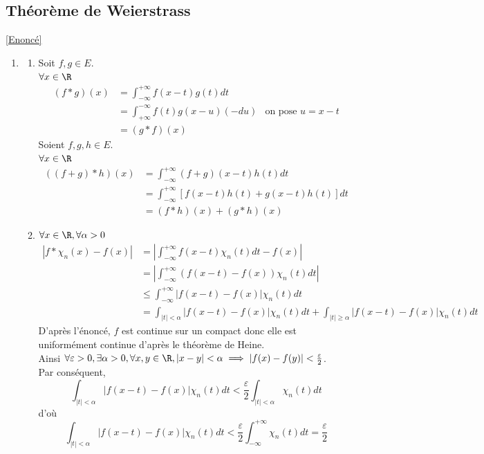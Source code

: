 \documentclass{book}
\begin{document}
	\subsection{Théorème de Weierstrass}
	\label{sec:theoreme-de-weierstrass}
	\textcolor{blue}{\hyperref[Théorème de Weierstrass]{[Enoncé]}}\\
	\begin{enumerate}[leftmargin=*]
		\item \begin{enumerate}[label=\alph*.]
		\item Soit $f,g\in E$.\\
		$\forall x\in\R$
		\begin{align*}
			(f*g)(x)&=\int_{-\infty}^{+\infty}f(x-t)g(t)dt\\
			&=\int_{+\infty}^{-\infty}f(t)g(x-u)(-du)&\text{on pose }u=x-t\\
			&=(g*f)(x) 
		\end{align*}
		Soient $f,g,h\in E$.\\
		$\forall x\in \R$
		\begin{align*}
			((f+g)*h)(x)&=\int_{-\infty}^{+\infty}(f+g)(x-t)h(t)dt\\
			&=\int_{-\infty}^{+\infty}\left[f(x-t)h(t)+g(x-t)h(t)\right]dt\\
			&=(f*h)(x)+(g*h)(x)
		\end{align*}
		\item 
		$\forall x\in\R,\forall \alpha >0$ 
		\begin{align*}
			|f*\chi_n(x)-f(x)|&=\left|\int_{-\infty}^{+\infty}f(x-t)\chi_n(t)dt-f(x)\right|\\
			&=\left|\int_{-\infty}^{+\infty}\left(f(x-t)-f(x)\right)\chi_n(t)dt\right|\\
			&\leq \int_{-\infty}^{+\infty}\left|f(x-t)-f(x)\right|\chi_n(t)dt\\
			&=\int_{|t|<\alpha}\left|f(x-t)-f(x)\right|\chi_n(t)dt+\int_{|t|\geq\alpha}\left|f(x-t)-f(x)\right|\chi_n(t)dt
		\end{align*}
		D'après l'énoncé, $f$ est continue sur un compact donc elle est uniformément continue d'après le théorème de Heine.\\
		Ainsi $\forall \varepsilon>0, \exists \alpha >0, \forall x,y\in\R, |x-y|<\alpha \implies |f(x)-f(y)|<\frac{\varepsilon}{2}$.\\
		Par conséquent, \[\int_{|t|<\alpha}|f(x-t)-f(x)|\chi_n(t)dt<\frac{\varepsilon}{2}\int_{|t|<\alpha}\chi_n(t)dt\]
		d'où \[\int_{|t|<\alpha}|f(x-t)-f(x)|\chi_n(t)dt<\frac{\varepsilon}{2}\int_{-\infty}^{+\infty}\chi_n(t)dt=\frac{\varepsilon}{2}\]

\end{enumerate}
\end{enumerate}
\end{document}
